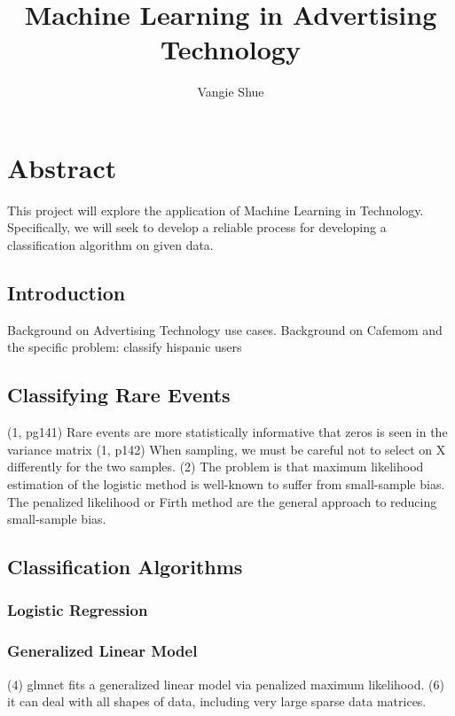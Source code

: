 \documentclass[a4paper]{article}
\title{Machine Learning in Advertising Technology}
\author{Vangie Shue}
\begin{document}


\maketitle
\section*{Abstract}
This project will explore the application of Machine Learning in Technology. Specifically, we will seek to develop a reliable process for developing a classification algorithm on given data.

\begin{multicols}{2}

\section*{Introduction}
Background on Advertising Technology use cases.
Background on Cafemom and the specific problem: classify hispanic users

\subsection*{Classifying Rare Events}
(1, pg141) Rare events are more statistically informative that zeros is seen in the variance matrix
(1, p142) When sampling, we must be careful not to select on X differently for the two samples.
(2) The problem is that maximum likelihood estimation of the logistic method is well-known to suffer from small-sample bias. The penalized likelihood or Firth method are the general approach to reducing small-sample bias.

\subsection*{Classification Algorithms}
\subsubsection*{Logistic Regression}
\subsubsection*{Generalized Linear Model}
(4) glmnet fits a generalized linear model via penalized maximum likelihood.
(6) it can deal with all shapes of data, including very large sparse data matrices.


\end{multicols}
\end{document}
